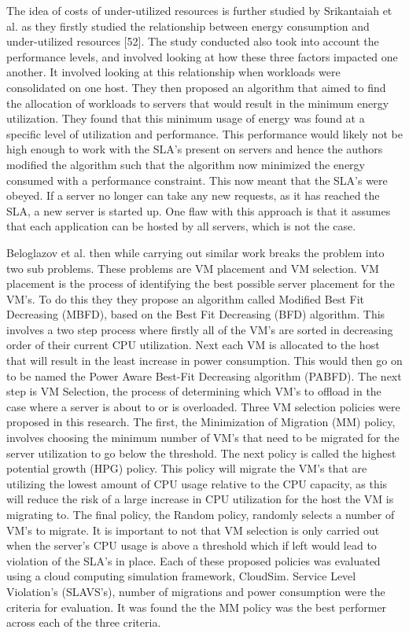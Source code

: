 \documentclass[oneside,12pt]{Classes/RoboticsLaTeX}
\begin{document}
The idea of costs of under-utilized resources is further studied by Srikantaiah et al. as they firstly studied the relationship between energy consumption and under-utilized resources [52]. The study conducted also took into account the performance levels, and involved looking at how these three factors impacted one another. It involved looking at this relationship when workloads were consolidated on one host. They then proposed an algorithm that aimed to find the allocation of workloads to servers that would result in the minimum energy utilization. They found that this minimum usage of energy was found at a specific level of utilization and performance. This performance would likely not be high enough to work with the SLA's present on servers and hence the authors modified the algorithm such that the algorithm now minimized the energy consumed with a performance constraint. This now meant that the SLA's were obeyed. If a server no longer can take any new requests, as it has reached the SLA, a new server is started up. One flaw with this approach is that it assumes that each application can be hosted by all servers, which is not the case. 

Beloglazov et al. then while carrying out similar work breaks the problem into two sub problems. These problems are VM placement and VM selection. VM placement is the process of identifying the best possible server placement for the VM's. To do this they they propose an algorithm called Modified Best Fit Decreasing (MBFD), based on the Best Fit Decreasing (BFD) algorithm. This involves a two step process where firstly all of the VM's are sorted in decreasing order of their current CPU utilization. Next each VM is allocated to the host that will result in the least increase in power consumption. This would then go on to be named the Power Aware Best-Fit Decreasing algorithm (PABFD). The next step is VM Selection, the process of determining which VM's to offload in the case where a server is about to or is overloaded. Three VM selection policies were proposed in this research. The first, the Minimization of Migration (MM) policy, involves choosing the minimum number of VM's that need to be migrated for the server utilization to go below the threshold. The next policy is called the highest potential growth (HPG) policy. This policy will migrate the VM's that are utilizing the lowest amount of CPU usage relative to the CPU capacity, as this will reduce the risk of a large increase in CPU utilization for the host the VM is migrating to. The final policy, the Random policy, randomly selects a number of VM's to migrate. It is important to not that VM selection is only carried out when the server's CPU usage is above a threshold which if left would lead to violation of the SLA's in place. Each of these proposed policies was evaluated using a cloud computing simulation framework, CloudSim. Service Level Violation's (SLAVS's), number of migrations and power consumption were the criteria for evaluation. It was found the the MM policy was the best performer across each of the three criteria. 
\end{document}

